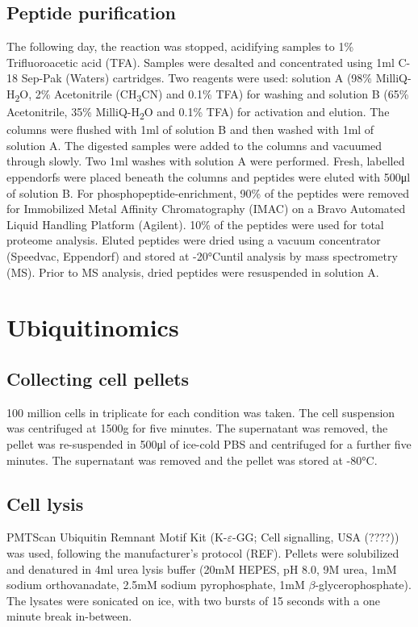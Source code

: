 \subsection{Peptide purification}
The following day, the reaction was stopped, acidifying samples to 1\% Trifluoroacetic acid (TFA).
Samples were desalted and concentrated using 1ml C-18 Sep-Pak (Waters) cartridges.
Two reagents were used: solution A (98\% MilliQ-H\textsubscript{2}O, 2\% Acetonitrile (CH\textsubscript{3}CN) and 0.1\% TFA) for washing and solution B (65\% Acetonitrile, 35\% MilliQ-H\textsubscript{2}O and 0.1\% TFA) for activation and elution.
The columns were flushed with 1ml of solution B and then washed with 1\si{\ml} of solution A.
The digested samples were added to the columns and vacuumed through slowly.
Two 1\si{\ml} washes with solution A were performed.
Fresh, labelled eppendorfs were placed beneath the columns and peptides were eluted with 500\si{\ul} of solution B.
For phosphopeptide-enrichment, 90\% of the peptides were removed for Immobilized Metal Affinity Chromatography (IMAC) on a Bravo Automated Liquid Handling Platform (Agilent). 10\% of the peptides were used for total proteome analysis.
Eluted peptides were dried using a vacuum concentrator (Speedvac, Eppendorf) and stored at -20\si{\degreeCelsius}until analysis by mass spectrometry (MS). Prior to MS analysis, dried peptides were resuspended in solution A.


\section{Ubiquitinomics}
%
\subsection{Collecting cell pellets}
100 million cells in triplicate for each condition was taken.
The cell suspension was centrifuged at 1500g for five minutes.
The supernatant was removed, the pellet was re-suspended in 500\si{\ul} of ice-cold PBS and centrifuged for a further five minutes.
The supernatant was removed and the pellet was stored at -80\si{\degreeCelsius}.

\subsection{Cell lysis}
PMTScan Ubiquitin Remnant Motif Kit (K-$\varepsilon$-GG; Cell signalling, USA (????)) was used, following the manufacturer's protocol (REF).
Pellets were solubilized and denatured in 4\si{\ml} urea lysis buffer (20mM HEPES, pH 8.0, 9M urea, 1mM sodium orthovanadate, 2.5mM sodium pyrophosphate, 1mM $\beta$-glycerophosphate). The lysates were sonicated on ice, with two bursts of 15 seconds with a one minute break in-between.

